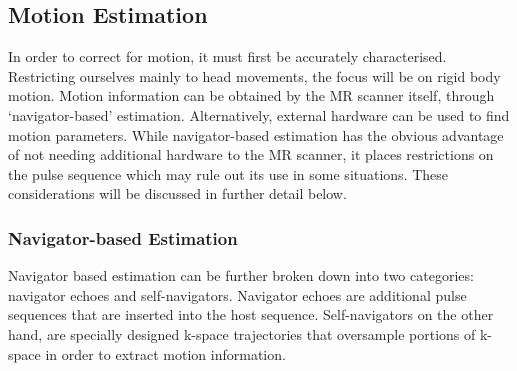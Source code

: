 \documentclass[class=article, crop=false]{standalone}
\begin{document}
	
\subsection{Motion Estimation} \label{Subsection4.1}
In order to correct for motion, it must first be accurately characterised. Restricting ourselves mainly to head movements, the focus will be on rigid body motion. Motion information can be obtained by the MR scanner itself, through `navigator-based' estimation. Alternatively, external hardware can be used to find motion parameters. While navigator-based estimation has the obvious advantage of not needing additional hardware to the MR scanner, it places restrictions on the pulse sequence which may rule out its use in some situations. These considerations will be discussed in further detail below.

\subsubsection{Navigator-based Estimation}
Navigator based estimation can be further broken down into two categories: navigator echoes and self-navigators. Navigator echoes are additional pulse sequences that are inserted into the host sequence. Self-navigators on the other hand, are specially designed k-space trajectories that oversample portions of k-space in order to extract motion information.
\end{document}
